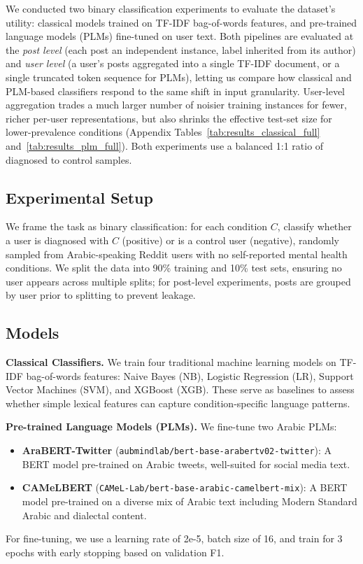 \documentclass[11pt]{article}
\begin{document}
We conducted two binary classification experiments to evaluate the dataset's utility: classical models trained on TF-IDF bag-of-words features, and pre-trained language models (PLMs) fine-tuned on user text. Both pipelines are evaluated at the \textit{post level} (each post an independent instance, label inherited from its author) and \textit{user level} (a user's posts aggregated into a single TF-IDF document, or a single truncated token sequence for PLMs), letting us compare how classical and PLM-based classifiers respond to the same shift in input granularity. User-level aggregation trades a much larger number of noisier training instances for fewer, richer per-user representations, but also shrinks the effective test-set size for lower-prevalence conditions (Appendix Tables~\ref{tab:results_classical_full} and~\ref{tab:results_plm_full}). Both experiments use a balanced 1:1 ratio of diagnosed to control samples.

\subsection{Experimental Setup}
\label{subsec:setup}

We frame the task as binary classification: for each condition $C$, classify whether a user is diagnosed with $C$ (positive) or is a control user (negative), randomly sampled from Arabic-speaking Reddit users with no self-reported mental health conditions. We split the data into 90\% training and 10\% test sets, ensuring no user appears across multiple splits; for post-level experiments, posts are grouped by user prior to splitting to prevent leakage.


\subsection{Models}
\label{subsec:models}

\textbf{Classical Classifiers.} We train four traditional machine learning models on TF-IDF bag-of-words features: Naive Bayes (NB), Logistic Regression (LR), Support Vector Machines (SVM), and XGBoost (XGB). These serve as baselines to assess whether simple lexical features can capture condition-specific language patterns.

\textbf{Pre-trained Language Models (PLMs).} We fine-tune two Arabic PLMs:
\begin{itemize}
    \item \textbf{AraBERT-Twitter} (\texttt{aubmindlab/bert-base-arabertv02-twitter}): A BERT model pre-trained on Arabic tweets, well-suited for social media text.
    \item \textbf{CAMeLBERT} (\texttt{CAMeL-Lab/bert-base-arabic-camelbert-mix}): A BERT model pre-trained on a diverse mix of Arabic text including Modern Standard Arabic and dialectal content.
\end{itemize}
For fine-tuning, we use a learning rate of 2e-5, batch size of 16, and train for 3 epochs with early stopping based on validation F1.
\end{document}
